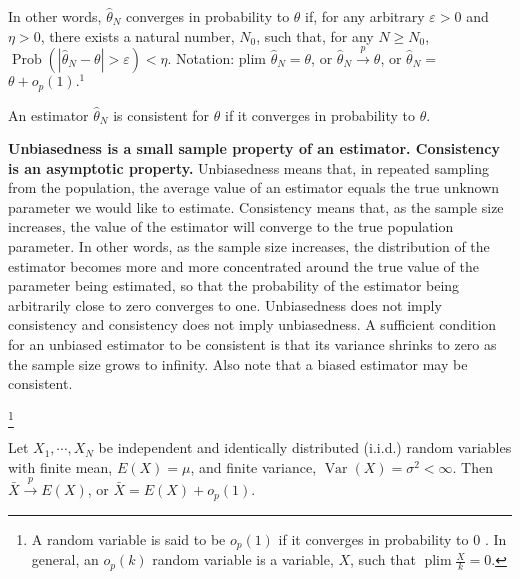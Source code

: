 In other words, $\widehat{\theta}_{N}$ converges in probability to $\theta$ if, for any arbitrary $\varepsilon>0$ and $\eta>0$, there exists a natural number, $N_{0}$, such that, for any $N \geq N_{0}$, $\operatorname{Prob}\left(\left|\widehat{\theta}_{N}-\theta\right|>\varepsilon\right)<\eta$. Notation: plim $\widehat{\theta}_{N}=\theta$, or $\widehat{\theta}_{N} \xrightarrow{p} \theta$, or $\widehat{\theta}_{N}=$ $\theta+o_{p}(1) .{ }^{1}$

\begin{definition}[Consistency]
    An estimator $\widehat{\theta}_{N}$ is consistent for $\theta$ if it converges in probability to $\theta$.
\end{definition}

\textbf{Unbiasedness is a small sample property of an estimator. Consistency is an asymptotic property.} Unbiasedness means that, in repeated sampling from the population, the average value of an estimator equals the true unknown parameter we would like to estimate. Consistency means that, as the sample size increases, the value of the estimator will converge to the true population parameter. In other words, as the sample size increases, the distribution of the estimator becomes more and more concentrated around the true value of the parameter being estimated, so that the probability of the estimator being arbitrarily close to zero converges to one. Unbiasedness does not imply consistency and consistency does not imply unbiasedness. A sufficient condition for an unbiased estimator to be consistent is that its variance shrinks to zero as the sample size grows to infinity. Also note that a biased estimator may be consistent.

\footnote{A random variable is said to be $o_{p}(1)$ if it converges in probability to 0 . In general, an $o_{p}(k)$ random variable is a variable, $X$, such that $\operatorname{plim} \frac{X}{k}=0$.
}

\begin{theorem}
    Let $X_{1}, \cdots, X_{N}$ be independent and identically distributed (i.i.d.) random variables with finite mean, $E(X)=\mu$, and finite variance, $\operatorname{Var}(X)=\sigma^{2}<\infty$. Then $\bar{X} \xrightarrow{p} E(X)$, or $\bar{X}=E(X)+o_{p}(1)$.
\end{theorem}

